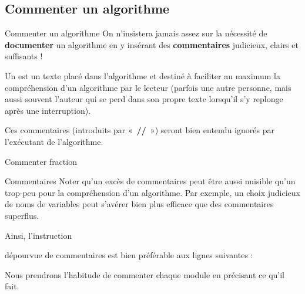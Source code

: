 \subsection{Commenter un algorithme}
\begin{frame}{Commenter un algorithme}
	On n’insistera jamais assez sur la nécessité de \textbf{documenter} un
	algorithme en y insérant des \textbf{commentaires} judicieux, clairs et
	suffisants ! 
	
	\bigskip
	
	Un  est un texte placé dans
	l'algorithme et destiné à faciliter au maximum la
	compréhension d’un algorithme par le lecteur (parfois une autre
	personne, mais aussi souvent l'auteur qui se perd dans
	son propre texte lorsqu'il s'y replonge après une
	interruption). 
	
	\bigskip
	
	Ces commentaires (introduits par
	«~\textbf{//}~») seront bien entendu ignorés par
	l’exécutant de l’algorithme.
\end{frame}

\begin{frame}{Commenter fraction}
\end{frame}

\begin{frame}{Commentaires}
	Noter qu’un excès de commentaires peut être aussi nuisible qu’un
	trop-peu pour la compréhension d’un algorithme. Par exemple, un choix
	judicieux de noms de variables peut s’avérer bien plus efficace que des
	commentaires superflus. 
	
	\bigskip
	
	Ainsi, l’instruction


	\bigskip
	
	dépourvue de commentaires est bien préférable aux lignes suivantes :

	\bigskip
	
	
	\bigskip
	
	Nous prendrons l'habitude de commenter chaque module en précisant ce qu'il fait.
\end{frame}

